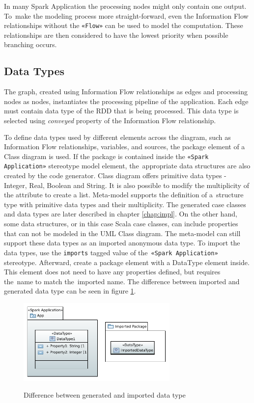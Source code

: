 In many Spark Application the processing nodes might only contain one output. To~make the modeling process more straight-forward, even the Information Flow relationships without the \texttt{«Flow»} can be used to model the computation. These relationships are then considered to have the lowest priority when possible branching occurs.  

\subsection*{Data Types}

The graph, created using Information Flow relationships as edges and processing nodes as nodes, instantiates the processing pipeline of the application. Each edge must contain data type of the RDD that is being processed. This data type is selected using \textit{conveyed} property of the Information Flow relationship. 

To define data types used by different elements across the diagram, such as Information Flow relationships, variables, and sources, the package element of a Class diagram is used. If the package is contained inside the \texttt{«Spark Application»} stereotype model element, the~appropriate data structures are also created by the code generator. Class diagram offers primitive data types - Integer, Real, Boolean and String. It is also possible to modify the multiplicity of the attribute to create a list. Meta-model supports the definition of a~structure type with primitive data types and their multiplicity. The generated case classes and data types are later described in chapter \ref{chap:impl}. On the other hand, some data structures, or in this case Scala case classes, can include properties that can not be modeled in the UML Class diagram. The meta-model can still support these data types as an imported anonymous data type. To import the data types, use the \texttt{imports} tagged value of the~\texttt{«Spark Application»} stereotype. Afterward, create a package element with a DataType element inside. This element does not need to have any properties defined, but requires the~name to match the~imported name. The difference between imported and generated data type can be seen in figure \ref{fig:datatypes}.


\begin{figure}[H]
\centering
\includegraphics[width=0.7\textwidth]{obrazky-figures/package-example-diagram.pdf}
\label{fig:datatypes}
\caption{Difference between generated and imported data type}
\end{figure}


